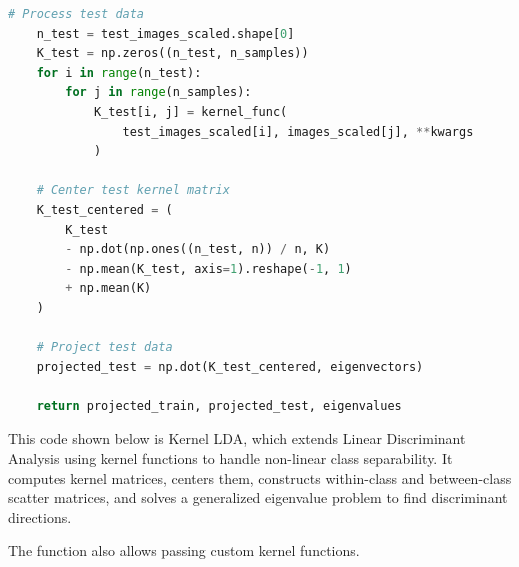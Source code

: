 \documentclass{homework}
\begin{document}
\begin{lstlisting}[language=Python]
    # Process test data
    n_test = test_images_scaled.shape[0]
    K_test = np.zeros((n_test, n_samples))
    for i in range(n_test):
        for j in range(n_samples):
            K_test[i, j] = kernel_func(
                test_images_scaled[i], images_scaled[j], **kwargs
            )

    # Center test kernel matrix
    K_test_centered = (
        K_test
        - np.dot(np.ones((n_test, n)) / n, K)
        - np.mean(K_test, axis=1).reshape(-1, 1)
        + np.mean(K)
    )

    # Project test data
    projected_test = np.dot(K_test_centered, eigenvectors)

    return projected_train, projected_test, eigenvalues
\end{lstlisting}

This code shown below is Kernel LDA, which extends Linear Discriminant Analysis using kernel functions to handle non-linear class separability. It computes kernel matrices, centers them, constructs within-class and between-class scatter matrices, and solves a generalized eigenvalue problem to find discriminant directions.

The function also allows passing custom kernel functions.
\end{document}

